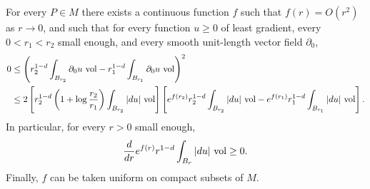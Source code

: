 \begin{proposition}\label{Monotonicity Formula}
For every $P \in M$ there exists a continuous function $f$ such that $f(r) = O(r^2)$ as $r \to 0$, and such that for every function $u \geq 0$ of least gradient, every $0 < r_1 < r_2$ small enough, and every smooth unit-length vector field $\partial_0$,
\begin{align*}
0
&\leq \left(r_2^{1 - d} \int_{B_{r_2}} \partial_0u ~\mathrm{vol} - r_1^{1 - d} \int_{B_{r_1}} \partial_0u ~\mathrm{vol} \right)^2\\
&\leq 2\left[r_2^{1 - d}\left(1 + \log \frac{r_2}{r_1}\right) \int_{B_{r_2}} |du| ~\mathrm{vol}\right] \left[e^{f(r_2)} r_2^{1 - d}\int_{B_{r_2}} |du| ~\mathrm{vol} - e^{f(r_1)} r_1^{1 - d} \int_{B_{r_1}} |du| ~\mathrm{vol} \right].
\end{align*}
In particular, for every $r > 0$ small enough,
\begin{equation}\label{TrueMonotonicity}
\frac{d}{dr} e^{f(r)} r^{1 - d} \int_{B_r} |du| ~\mathrm{vol} \geq 0.
\end{equation}
Finally, $f$ can be taken uniform on compact subsets of $M$.
\end{proposition}
